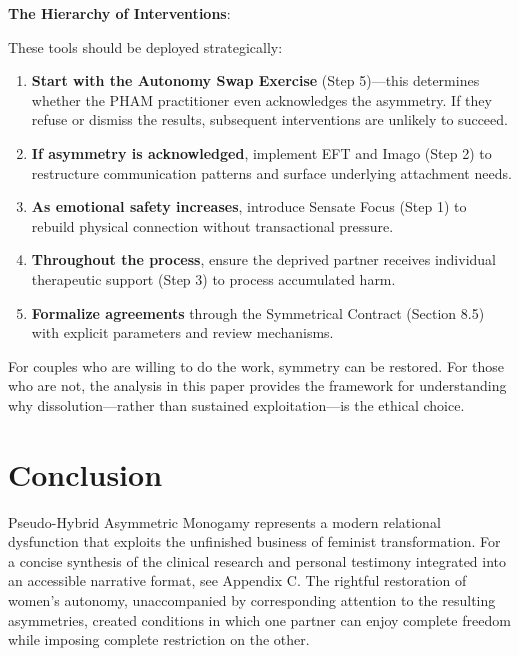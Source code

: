 \documentclass[12pt,openany]{book}
\numberwithin{equation}{chapter}
\begin{document}
\textbf{The Hierarchy of Interventions}:

These tools should be deployed strategically:

\begin{enumerate}
    \item \textbf{Start with the Autonomy Swap Exercise} (Step 5)---this determines whether the PHAM practitioner even acknowledges the asymmetry. If they refuse or dismiss the results, subsequent interventions are unlikely to succeed.
    
    \item \textbf{If asymmetry is acknowledged}, implement EFT and Imago (Step 2) to restructure communication patterns and surface underlying attachment needs.
    
    \item \textbf{As emotional safety increases}, introduce Sensate Focus (Step 1) to rebuild physical connection without transactional pressure.
    
    \item \textbf{Throughout the process}, ensure the deprived partner receives individual therapeutic support (Step 3) to process accumulated harm.
    
    \item \textbf{Formalize agreements} through the Symmetrical Contract (Section 8.5) with explicit parameters and review mechanisms.
\end{enumerate}

For couples who are willing to do the work, symmetry can be restored. For those who are not, the analysis in this paper provides the framework for understanding why dissolution---rather than sustained exploitation---is the ethical choice.

\chapter{Conclusion}

Pseudo-Hybrid Asymmetric Monogamy represents a modern relational dysfunction that exploits the unfinished business of feminist transformation. For a concise synthesis of the clinical research and personal testimony integrated into an accessible narrative format, see Appendix C. The rightful restoration of women's autonomy, unaccompanied by corresponding attention to the resulting asymmetries, created conditions in which one partner can enjoy complete freedom while imposing complete restriction on the other.
\end{document}

